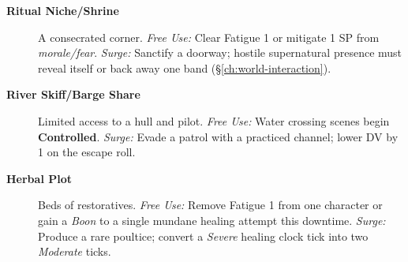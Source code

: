 \begin{description}
  \item[\textbf{Ritual Niche/Shrine}]  A consecrated corner. \emph{Free Use:} Clear Fatigue 1 or mitigate 1 SP from \emph{morale/fear}. \emph{Surge:} Sanctify a doorway; hostile supernatural presence must reveal itself or back away one band (\S\ref{ch:world-interaction}).
  \item[\textbf{River Skiff/Barge Share}]  Limited access to a hull and pilot. \emph{Free Use:} Water crossing scenes begin \textbf{Controlled}. \emph{Surge:} Evade a patrol with a practiced channel; lower DV by 1 on the escape roll.
  \item[\textbf{Herbal Plot}]  Beds of restoratives. \emph{Free Use:} Remove Fatigue 1 from one character or gain a \emph{Boon} to a single mundane healing attempt this downtime. \emph{Surge:} Produce a rare poultice; convert a \emph{Severe} healing clock tick into two \emph{Moderate} ticks.
\end{description}

